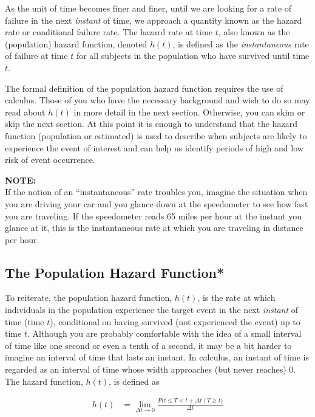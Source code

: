 \documentclass[
]{report}
\begin{document}
As the unit of time becomes finer and finer, until we are looking for a rate of failure in the next \emph{instant} of time, we approach a quantity known as the hazard rate or conditional failure rate. The hazard rate at time \(t\), also known as the (population) hazard function, denoted \(h(t)\), is defined as the \emph{instantaneous} rate of failure at time \(t\) for all subjects in the population who have survived until time \(t\).

The formal definition of the population hazard function requires the use of calculus. Those of you who have the necessary background and wish to do so may read about \(h(t)\) in more detail in the next section. Otherwise, you can skim or skip the next section. At this point it is enough to understand that the hazard function (population or estimated) is used to describe when subjects are likely to experience the event of interest and can help us identify periods of high and low risk of event occurrence.

\large

\textbf{NOTE:}\\
If the notion of an ``instantaneous'' rate troubles you, imagine the situation when you are driving your car and you glance down at the speedometer to see how fast you are traveling. If the speedometer reads 65 miles per hour at the instant you glance at it, this is the instantaneous rate at which you are traveling in distance per hour.\\
\normalsize

\subsection*{The Population Hazard Function*}\label{the-population-hazard-function}

To reiterate, the population hazard function, \(h(t)\), is the rate at which individuals in the population experience the target event in the next \emph{instant} of time (time \(t\)), conditional on having survived (not experienced the event) up to time \(t\). Although you are probably comfortable with the idea of a small interval of time like one second or even a tenth of a second, it may be a bit harder to imagine an interval of time that lasts an instant. In calculus, an instant of time is regarded as an interval of time whose width approaches (but never reaches) 0. The hazard function, \(h(t)\), is defined as

\begin{align}\label{9.13}
h(t) &= \lim_{\Delta t \to 0} \frac{P\bigl(t \le T < t + \Delta t \mid T \ge t\bigr)}{\Delta t}
\tag{9.13}
\end{align}
\end{document}
